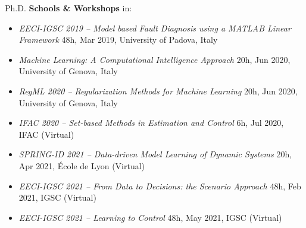 \documentclass[10pt]{article}
\begin{document}
Ph.D. \textbf{Schools \& Workshops} in:
\begin{itemize}
	\setlength\itemsep{-8pt}
	\renewcommand\labelitemi{$\vcenter{\hbox{\tiny$\bullet$}}$}
	\vspace{-4pt}

	\item \textit{EECI-IGSC 2019 -- Model based Fault Diagnosis using a MATLAB Linear Framework} \hfill 48h, Mar 2019, University of Padova, Italy\\
	\vspace{-4pt}{\tiny Proff. A. Varga and D. Ossmann}

	\item \textit{Machine Learning: A Computational Intelligence Approach} \hfill 20h, Jun 2020, University of Genova, Italy\\
	\vspace{-4pt}{\tiny Proff. F. Masulli and S. Rovetta}
	
	\item \textit{RegML 2020 -- Regularization Methods for Machine Learning} \hfill 20h, Jun 2020, University of Genova, Italy\\
	\vspace{-4pt}{\tiny Prof. L. Rosasco}

	\item \textit{IFAC 2020 -- Set-based Methods in Estimation and Control} \hfill 6h, Jul 2020, IFAC (Virtual)\\
	\vspace{-4pt}{\tiny Proff. R. Paulen, M. E. Villanueva and B. Chachuat}

	\item \textit{SPRING-ID 2021 -- Data-driven Model Learning of Dynamic Systems} \hfill 20h, Apr 2021, École de Lyon (Virtual)\\
	\vspace{-4pt}{\tiny Proff. B. Xavier and P. Van den Hof}

	\item \textit{EECI-IGSC 2021 -- From Data to Decisions: the Scenario Approach} \hfill 48h, Feb 2021, IGSC (Virtual)\\
	\vspace{-4pt}{\tiny Proff. M. C. Campi and S. Garatti}

	\item \textit{EECI-IGSC 2021 -- Learning to Control} \hfill 48h, May 2021, IGSC (Virtual)\\
	\vspace{-4pt}{\tiny Prof. S. Formentin}

\end{itemize}
\end{document}
